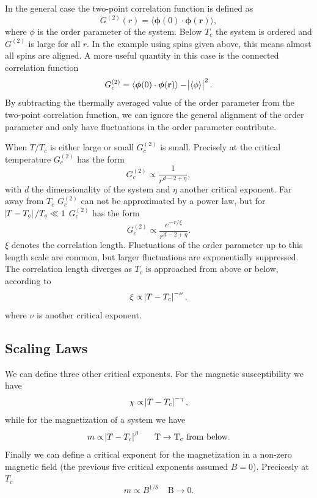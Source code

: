 \documentclass[11pt, a4paper]{report} %
\begin{document}
In the general case the two-point correlation function is defined as
\begin{equation}
	G^{(2)}(r) = \langle \boldsymbol{\phi}(0) \cdot \boldsymbol{\phi}(\mathbf{r}) \rangle,
\end{equation}
where \(\phi\) is the order parameter of the system.
Below \(T_c\) the system is ordered and \(G^{(2)}\) is large for all \(r\).
In the example using spins given above, this means almost all spins are aligned.
A more useful quantity in this case is the connected correlation function
\begin{equation}
	G_c^{(2)} = \langle \boldsymbol{\phi}(0) \cdot \boldsymbol{\phi}(\mathbf{r}) \rangle - \abs{\langle \phi \rangle}^2.
\end{equation}
By subtracting the thermally averaged value of the order parameter from the two-point correlation function, we can ignore the general alignment of the order parameter and only have fluctuations in the order parameter contribute.

When \(T/T_c\) is either large or small \(G_c^{(2)}\) is small.
Precisely at the critical temperature \(G_c^{(2)}\) has the form
\begin{equation}
	G_c^{(2)} \propto \frac{1}{r^{d-2+\eta}},
\end{equation}
with \(d\) the dimensionality of the system and \(\eta\) another critical exponent.
Far away from \(T_c\) \(G_c^{(2)}\) can not be approximated by a power law, but for \(\abs{T-T_c} / T_c \ll 1\) \(G_c^{(2)}\) has the form
\begin{equation}
	G_c^{(2)} \propto \frac{e^{-r/\xi}}{r^{d-2+\eta}}.
\end{equation}
\(\xi\) denotes the correlation length.
Fluctuations of the order parameter up to this length scale are common, but larger fluctuations are exponentially suppressed.
The correlation length diverges as \(T_c\) is approached from above or below, according to
\begin{equation}
	\label{eq:correlation_length}
	\xi \propto \abs{T-T_c}^{-\nu},
\end{equation}
where \(\nu\) is another critical exponent.

\subsection{Scaling Laws} \label{sec:scaling_laws}
We can define three other critical exponents.
For the magnetic susceptibility we have
\begin{equation}
	\label{eq:chi_divergence}
	\chi \propto \abs{T-T_c}^{-\gamma},
\end{equation}
while for the magnetization of a system we have
\begin{equation}
	\label{eq:magnetization_beta}
	m \propto \abs{T-T_c}^{\beta} \mathrm{\ \ \ \ \ T \to T_c\ from\ below}.
\end{equation}
Finally we can define a critical exponent for the magnetization in a non-zero magnetic field (the previous five critical exponents assumed \(B=0\)).
Precicesly at \(T_c\)
\begin{equation}
	m \propto B^{1/\delta} \mathrm{\ \ \ \ \ B \to 0}.
\end{equation}
\end{document}
